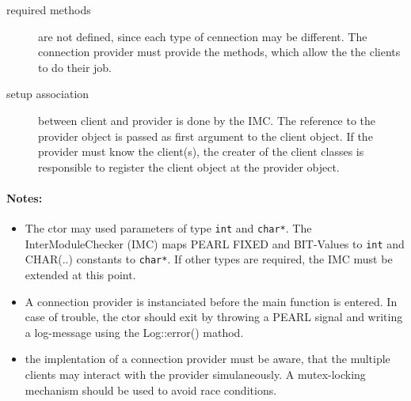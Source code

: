 \begin{description}
\item [required methods] are not defined, since each type of cennection
   may be different. 
    The connection provider must provide the methods, which allow the the
    clients to do their job. 
\item [setup association] between client  and provider is done by the
    IMC. The reference to the provider object is passed as first argument
    to the client object. If the provider must know the client(s),
    the creater of the client classes is responsible to register the
    client object at the provider object.
\end{description}

\paragraph{Notes:}
\begin{itemize}
\item The ctor may used parameters of type \verb|int| and \verb|char*|.
  The InterModuleChecker (IMC) maps PEARL FIXED and BIT-Values to \verb|int|
  and CHAR(..) constants to \verb|char*|.
  If other types are required, the IMC must be extended at this point.
\item A connection provider is instanciated before the main function
  is entered. In case of trouble, the ctor should exit by throwing a 
  PEARL signal and writing a log-message using the Log::error()  mathod.
\item the implentation of a connection provider must be aware, that 
   the multiple clients may interact with the provider simulaneously.
   A mutex-locking mechanism should be used to avoid race conditions.
\end{itemize}

